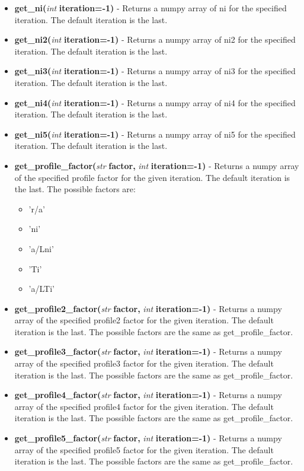 \documentclass{article}
\begin{document}
\begin{itemize}
\begin{itemize}
\item \textbf{get\_ni(}\emph{int}\textbf{ iteration=-1)} - Returns a numpy array of ni for the specified iteration.  The default iteration is the last.
\item \textbf{get\_ni2(}\emph{int}\textbf{ iteration=-1)} - Returns a numpy array of ni2 for the specified iteration.  The default iteration is the last.
\item \textbf{get\_ni3(}\emph{int}\textbf{ iteration=-1)} - Returns a numpy array of ni3 for the specified iteration.  The default iteration is the last.
\item \textbf{get\_ni4(}\emph{int}\textbf{ iteration=-1)} - Returns a numpy array of ni4 for the specified iteration.  The default iteration is the last.
\item \textbf{get\_ni5(}\emph{int}\textbf{ iteration=-1)} - Returns a numpy array of ni5 for the specified iteration.  The default iteration is the last.
\item \textbf{get\_profile\_factor(}\emph{str}\textbf{ factor,}\emph{ int}\textbf{ iteration=-1)} - Returns a numpy array of the specified profile factor for the given iteration.  The default iteration is the last.  The possible factors are:
\begin{itemize}
\item 'r/a'
\item 'ni'
\item 'a/Lni'
\item 'Ti'
\item 'a/LTi'
\end{itemize}
\item \textbf{get\_profile2\_factor(}\emph{str}\textbf{ factor,}\emph{ int}\textbf{ iteration=-1)} - Returns a numpy array of the specified profile2 factor for the given iteration.  The default iteration is the last.  The possible factors are the same as get\_profile\_factor.
\item \textbf{get\_profile3\_factor(}\emph{str}\textbf{ factor,}\emph{ int}\textbf{ iteration=-1)} - Returns a numpy array of the specified profile3 factor for the given iteration.  The default iteration is the last.  The possible factors are the same as get\_profile\_factor.
\item \textbf{get\_profile4\_factor(}\emph{str}\textbf{ factor,}\emph{ int}\textbf{ iteration=-1)} - Returns a numpy array of the specified profile4 factor for the given iteration.  The default iteration is the last.  The possible factors are the same as get\_profile\_factor.
\item \textbf{get\_profile5\_factor(}\emph{str}\textbf{ factor,}\emph{ int}\textbf{ iteration=-1)} - Returns a numpy array of the specified profile5 factor for the given iteration.  The default iteration is the last.  The possible factors are the same as get\_profile\_factor.

\end{itemize}
\end{itemize}
\end{document}
